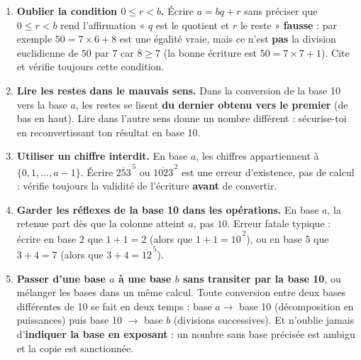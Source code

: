 \documentclass[11pt]{article}
\newcounter{popsec}
\newcounter{popsub}
\newcommand{\courssub}[1]{%
  \stepcounter{popsub}%
  \par\vspace{9pt}\noindent{\popxbold\fontsize{11.5}{13}\selectfont\color{popink}{\color{poporange}\thepopsec.\thepopsub}\hspace{6pt}#1}\par\nopagebreak\vspace{4pt}
}
\begin{document}
\begin{attention}
\begin{enumerate}
\item \textbf{Oublier la condition $0 \leq r < b$.} Écrire $a = bq + r$ sans préciser que $0 \leq r < b$ rend l'affirmation « $q$ est le quotient et $r$ le reste » \textbf{fausse} : par exemple $50 = 7 \times 6 + 8$ est une égalité vraie, mais ce n'est \textbf{pas} la division euclidienne de $50$ par $7$ car $8 \geq 7$ (la bonne écriture est $50 = 7 \times 7 + 1$). Cite et vérifie toujours cette condition.
\item \textbf{Lire les restes dans le mauvais sens.} Dans la conversion de la base 10 vers la base $a$, les restes se lisent \textbf{du dernier obtenu vers le premier} (de bas en haut). Lire dans l'autre sens donne un nombre différent : sécurise-toi en reconvertissant ton résultat en base 10.
\item \textbf{Utiliser un chiffre interdit.} En base $a$, les chiffres appartiennent à $\{0, 1, \ldots, a-1\}$. Écrire $\overline{253}^{\,5}$ ou $\overline{1023}^{\,2}$ est une erreur d'existence, pas de calcul : vérifie toujours la validité de l'écriture \textbf{avant} de convertir.
\item \textbf{Garder les réflexes de la base 10 dans les opérations.} En base $a$, la retenue part dès que la colonne atteint $a$, pas $10$. Erreur fatale typique : écrire en base $2$ que $1 + 1 = 2$ (alors que $1 + 1 = \overline{10}^{\,2}$), ou en base $5$ que $3 + 4 = 7$ (alors que $3 + 4 = \overline{12}^{\,5}$).
\item \textbf{Passer d'une base $a$ à une base $b$ sans transiter par la base 10}, ou mélanger les bases dans un même calcul. Toute conversion entre deux bases différentes de 10 se fait en deux temps : base $a \to$ base 10 (décomposition en puissances) puis base 10 $\to$ base $b$ (divisions successives). Et n'oublie jamais d'\textbf{indiquer la base en exposant} : un nombre sans base précisée est ambigu et la copie est sanctionnée.
\end{enumerate}
\end{attention}

\courssub{Entraînement et évaluation}
\end{document}
